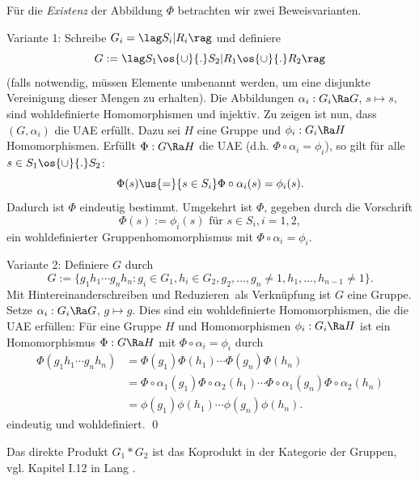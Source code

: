 Für die \textsl{Existenz} der Abbildung $\Phi$ betrachten wir zwei
Beweisvarianten.

Variante 1: Schreibe $G_i = \lag S_i|R_i \rag$ und definiere
\[
G := \lag S_1 \os{\cup}{.} S_2 | R_1 \os{\cup}{.} R_2 \rag
\]
(falls notwendig, müssen Elemente umbenannt werden, um eine
disjunkte Vereinigung dieser Mengen zu erhalten).
Die Abbildungen $\alpha_i:G_i\Ra G$, $s\mapsto s$, sind
wohldefinierte Homomorphismen und injektiv.
Zu zeigen ist nun, dass $(G,\alpha_i)$ die UAE erfüllt.
Dazu sei $H$ eine Gruppe und $\phi_i:G_i\Ra H$ Homomorphismen.
Erfüllt $\Phi:G\Ra H$ die UAE (d.h. $\Phi\circ\alpha_i=\phi_i$), so gilt für
alle $s\in S_1\os{\cup}{.} S_2$:
\[
\Phi(s) \us{=}{s\in S_i} \Phi\circ\alpha_i(s)
=\phi_i(s).
\]
Dadurch ist $\Phi$ eindeutig bestimmt.
Umgekehrt ist $\Phi$, gegeben durch die Vorschrift
\[
\Phi(s) := \phi_i(s) \text{ für } s\in S_i, i=1,2,
\]
ein wohldefinierter Gruppenhomomorphismus mit
$\Phi\circ\alpha_i=\phi_i$.

Variante 2: Definiere $G$ durch
\[
G := \{ g_1 h_1 \cdots g_n h_n : g_i\in G_1, h_i \in G_2,
g_2,\ldots,g_n\neq 1, h_1,\ldots,h_{n-1}\neq 1\}.
\]
Mit \glqq Hintereinanderschreiben und Reduzieren\grqq\ als 
Verknüpfung ist $G$ eine Gruppe.
Setze $\alpha_i:G_i\Ra G$, $g\mapsto g$.
Dies sind ein wohldefinierte Homomorphismen, die die UAE erfüllen:
Für eine Gruppe $H$ und Homomorphismen $\phi_i:G_i\Ra H$ ist
ein Homomorphismus $\Phi:G\Ra H$ mit $\Phi\circ\alpha_i=\phi_i$
durch
\begin{align*}
\Phi(g_1 h_1\cdots g_n h_n) &=
\Phi(g_1)\Phi(h_1)\cdots \Phi(g_n)\Phi(h_n) \\
&= \Phi\circ\alpha_1(g_1)\Phi\circ\alpha_2(h_1)\cdots\Phi\circ\alpha_1(g_n)\Phi\circ\alpha_2(h_n) \\
&= \phi(g_1)\phi(h_1)\cdots \phi(g_n)\phi(h_n).
\end{align*}
eindeutig und wohldefiniert.
\qed

\BEM Das direkte Produkt $G_1*G_2$ ist das Koprodukt in der Kategorie
der Gruppen, vgl. Kapitel I.12 in Lang \cite{lang}.

